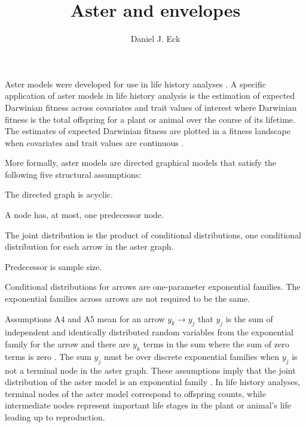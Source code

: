\documentclass[12pt]{article}
\title{Aster and envelopes}
\author{Daniel J. Eck}
\begin{document}
\maketitle

Aster models \citep*{geyer-aster} were developed for use in life history 
analyses \citep*{shaw-aster}. A specific application of aster models in life 
history analysis is the estimation of expected Darwinian fitness across 
covariates and trait values of interest where Darwinian fitness is the total 
offspring for a plant or animal over the course of its lifetime. The estimates 
of expected Darwinian fitness are plotted in a fitness landscape when 
covariates and trait values are continuous \citep*{shaw-fit-land, eck-evol}.

More formally, aster models \citep*{geyer-aster} are directed graphical models 
that satisfy the following five structural assumptions:
\begin{itemize}
{\setlength\itemindent{20pt}\item[A1.] The directed graph is acyclic.}
{\setlength\itemindent{20pt}\item[A2.] A node has, at most, one 
  predecessor node.}
{\setlength\itemindent{20pt}\item[A3.] The joint distribution is the product 
  of conditional distributions, one conditional distribution for each arrow in 
  the aster graph.}
{\setlength\itemindent{20pt}\item[A4.] Predecessor is sample size. }
{\setlength\itemindent{20pt}\item[A5.] Conditional distributions for arrows 
  are one-parameter exponential families. The exponential families across 
  arrows are not required to be the same. }
\end{itemize}
Assumptions A4 and A5 mean for an arrow $y_k \longrightarrow y_j$
that $y_j$ is the sum of independent and identically distributed random
variables from the exponential family for the arrow and there are $y_k$
terms in the sum where the sum of zero terms is zero \citep*{eck-asterenv}. 
The sum $y_j$ must be over discrete exponential families when $y_j$ is not a 
terminal node in the aster graph. These assumptions imply that the joint 
distribution of the aster model is an exponential family 
\citep*[Section 2.3]{geyer-aster}. In life history analyses, terminal nodes 
of the aster model correspond to offspring counts, while intermediate nodes 
represent important life stages in the plant or animal's life leading up to 
reproduction. 
\end{document}
